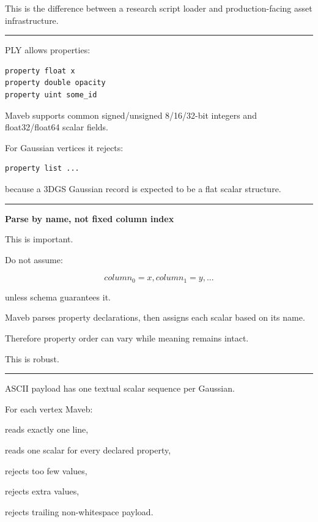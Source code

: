 This is the difference between a research script loader and production-facing asset infrastructure.

\begin{center}\rule{0.5\linewidth}{0.5pt}\end{center}

PLY allows properties:

\protect{}\label{68k852}%
\begin{verbatim}
property float x
property double opacity
property uint some_id
\end{verbatim}

Maveb supports common signed/unsigned 8/16/32-bit integers and float32/float64 scalar fields.

For Gaussian vertices it rejects:

\protect{}\label{gkre1f}%
\begin{verbatim}
property list ...
\end{verbatim}

because a 3DGS Gaussian record is expected to be a flat scalar structure.

\begin{center}\rule{0.5\linewidth}{0.5pt}\end{center}

\textbf{Parse by name, not fixed column index}

This is important.

Do not assume:

\[
column_0=x,
column_1=y,...
\]

unless schema guarantees it.

Maveb parses property declarations, then assigns each scalar based on its name.

Therefore property order can vary while meaning remains intact.

This is robust.

\begin{center}\rule{0.5\linewidth}{0.5pt}\end{center}

ASCII payload has one textual scalar sequence per Gaussian.

For each vertex Maveb:

reads exactly one line,

reads one scalar for every declared property,

rejects too few values,

rejects extra values,

rejects trailing non-whitespace payload.

